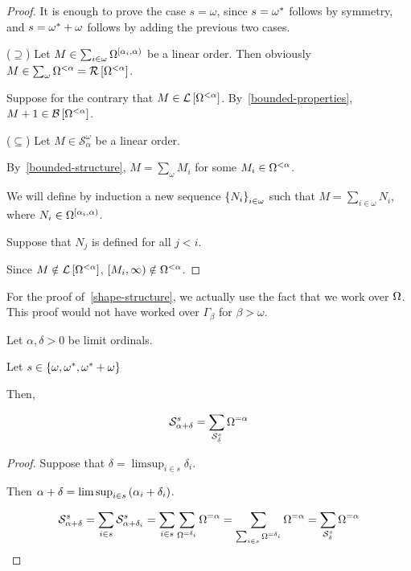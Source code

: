 \begin{proof}
  It is enough to prove the case $s = \omega$,
  since $s = \omega^\ast$ follows by symmetry,
  and $s = \omega^\ast + \omega$ follows by adding the previous two cases.

  ($\supseteq$) Let $M \in \sum_{i \in \omega}{\Omega^{[\alpha_i, \alpha)}}$ be a linear order.
  Then obviously $M \in \sum_{\omega}{\Omega^{< \alpha}} = \mathcal{R} \left[ {{\Omega^{< \alpha}}} \right]$.
  
  Suppose for the contrary that $M \in \mathcal{L} \left[ {{\Omega^{< \alpha}}} \right]$.
  By~\cref{bounded-properties}, $M + 1 \in \mathcal{B} \left[ {{\Omega^{< \alpha}}} \right]$.

  ($\subseteq$) Let $M \in \mathcal{S}^{\omega}_{\alpha}$ be a linear order.

  By~\cref{bounded-structure}, $M = \sum_{\omega}{M_i}$ for some $M_i \in \Omega^{< \alpha}$.
  
  We will define by induction a new sequence $\left\{ {N_i} \right\}_{i \in \omega}$ such that $M = \sum_{i \in \omega} N_i$,
  where $N_i \in \Omega^{[\alpha_i, \alpha)}$.

  Suppose that $N_j$ is defined for all $j < i$.

  Since $M \notin \mathcal{L} \left[ {{\Omega^{< \alpha}}} \right]$, $[M_i, \infty) \notin \Omega^{< \alpha}$.
\end{proof}

\begin{note}
  For the proof of~\cref{shape-structure}, we actually use the fact that
  we work over $\Omega$. This proof would not have worked over $\Gamma_{\beta}$
  for $\beta > \omega$.
\end{note}

\begin{corollary}
  Let $\alpha, \delta > 0$ be limit ordinals.

  Let $s \in \left\{ {\omega, \omega^\ast, \omega^\ast + \omega} \right\}$

  Then,

  \[
    \mathcal{S}^{s}_{\alpha + \delta}
    = \sum_{\mathcal{S}^{s}_{\delta}}{\Omega^{= \alpha}}
  \]
\end{corollary}

\begin{proof}
  Suppose that $\delta = \limsup_{i \in s} \delta_i$.

  Then $\alpha + \delta = \limsup_{i \in s} \left( {\alpha_i + \delta_i} \right)$.

  \[
    \mathcal{S}^{s}_{\alpha + \delta}
    = \sum_{i \in s}{\mathcal{S}^{s}_{\alpha + \delta_i}}
    = \sum_{i \in s}\sum_{\Omega^{= \delta_i}}{\Omega^{= \alpha}}
    = \sum_{\sum_{i \in s}{\Omega^{= \delta_i}}}{\Omega^{= \alpha}}
    = \sum_{\mathcal{S}^{s}_{\delta}}{\Omega^{= \alpha}}
  \]
\end{proof}
